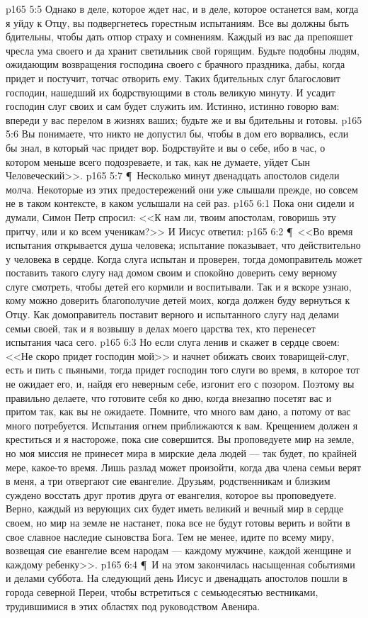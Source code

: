 \vs p165 5:5 Однако в деле, которое ждет нас, и в деле, которое останется вам, когда я уйду к Отцу, вы подвергнетесь горестным испытаниям. Все вы должны быть бдительны, чтобы дать отпор страху и сомнениям. Каждый из вас да препояшет чресла ума своего и да хранит светильник свой горящим. Будьте подобны людям, ожидающим возвращения господина своего с брачного праздника, дабы, когда придет и постучит, тотчас отворить ему. Таких бдительных слуг благословит господин, нашедший их бодрствующими в столь великую минуту. И усадит господин слуг своих и сам будет служить им. Истинно, истинно говорю вам: впереди у вас перелом в жизнях ваших; будьте же и вы бдительны и готовы.
\vs p165 5:6 Вы понимаете, что никто не допустил бы, чтобы в дом его ворвались, если бы знал, в который час придет вор. Бодрствуйте и вы о себе, ибо в час, о котором меньше всего подозреваете, и так, как не думаете, уйдет Сын Человеческий>>.
\vs p165 5:7 \P\ Несколько минут двенадцать апостолов сидели молча. Некоторые из этих предостережений они уже слышали прежде, но совсем не в таком контексте, в каком услышали на сей раз.
\vs p165 6:1 Пока они сидели и думали, Симон Петр спросил: <<К нам ли, твоим апостолам, говоришь эту притчу, или и ко всем ученикам?>> И Иисус ответил:
\vs p165 6:2 \P\ <<Во время испытания открывается душа человека; испытание показывает, что действительно у человека в сердце. Когда слуга испытан и проверен, тогда домоправитель может поставить такого слугу над домом своим и спокойно доверить сему верному слуге смотреть, чтобы детей его кормили и воспитывали. Так и я вскоре узнаю, кому можно доверить благополучие детей моих, когда должен буду вернуться к Отцу. Как домоправитель поставит верного и испытанного слугу над делами семьи своей, так и я возвышу в делах моего царства тех, кто перенесет испытания часа сего.
\vs p165 6:3 Но если слуга ленив и скажет в сердце своем: <<Не скоро придет господин мой>> и начнет обижать своих товарищей\hyp{}слуг, есть и пить с пьяными, тогда придет господин того слуги во время, в которое тот не ожидает его, и, найдя его неверным себе, изгонит его с позором. Поэтому вы правильно делаете, что готовите себя ко дню, когда внезапно посетят вас и притом так, как вы не ожидаете. Помните, что много вам дано, а потому от вас много потребуется. Испытания огнем приближаются к вам. Крещением должен я креститься и я настороже, пока сие совершится. Вы проповедуете мир на земле, но моя миссия не принесет мира в мирские дела людей --- так будет, по крайней мере, какое\hyp{}то время. Лишь разлад может произойти, когда два члена семьи верят в меня, а три отвергают сие евангелие. Друзьям, родственникам и близким суждено восстать друг против друга от евангелия, которое вы проповедуете. Верно, каждый из верующих сих будет иметь великий и вечный мир в сердце своем, но мир на земле не настанет, пока все не будут готовы верить и войти в свое славное наследие сыновства Бога. Тем не менее, идите по всему миру, возвещая сие евангелие всем народам --- каждому мужчине, каждой женщине и каждому ребенку>>.
\vs p165 6:4 \P\ И на этом закончилась насыщенная событиями и делами суббота. На следующий день Иисус и двенадцать апостолов пошли в города северной Переи, чтобы встретиться с семьюдесятью вестниками, трудившимися в этих областях под руководством Авенира.
